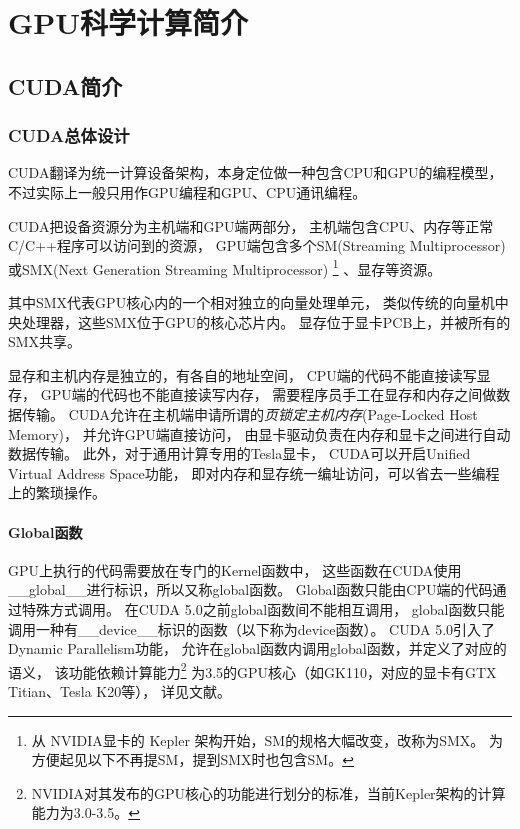 


\chapter{GPU科学计算简介}

\section{CUDA简介}

\subsection{CUDA总体设计}

CUDA翻译为统一计算设备架构，本身定位做一种包含CPU和GPU的编程模型，
不过实际上一般只用作GPU编程和GPU、CPU通讯编程。

CUDA把设备资源分为主机端和GPU端两部分，
主机端包含CPU、内存等正常C/C++程序可以访问到的资源，
GPU端包含多个SM(Streaming Multiprocessor)
或SMX(Next Generation Streaming Multiprocessor)
\footnote{从 NVIDIA显卡的 Kepler 架构开始，SM的规格大幅改变，改称为SMX。
为方便起见以下不再提SM，提到SMX时也包含SM。}
、显存等资源。

其中SMX代表GPU核心内的一个相对独立的向量处理单元，
类似传统的向量机中央处理器，这些SMX位于GPU的核心芯片内。
显存位于显卡PCB上，并被所有的SMX共享。

显存和主机内存是独立的，有各自的地址空间，
CPU端的代码不能直接读写显存，
GPU端的代码也不能直接读写内存，
需要程序员手工在显存和内存之间做数据传输。
CUDA允许在主机端申请所谓的\emph{页锁定主机内存}(Page-Locked Host Memory)，
并允许GPU端直接访问，
由显卡驱动负责在内存和显卡之间进行自动数据传输。
此外，对于通用计算专用的Tesla显卡，
CUDA可以开启Unified Virtual Address Space功能，
即对内存和显存统一编址访问，可以省去一些编程上的繁琐操作。
\cite{cudadoc-cprogrammingguide}

\subsubsection{Global函数}

GPU上执行的代码需要放在专门的Kernel函数中，
这些函数在CUDA使用\_\_global\_\_进行标识，所以又称global函数。
Global函数只能由CPU端的代码通过特殊方式调用。
在CUDA 5.0之前global函数间不能相互调用，
global函数只能调用一种有\_\_device\_\_标识的函数（以下称为device函数）。
CUDA 5.0引入了Dynamic Parallelism功能，
允许在global函数内调用global函数，并定义了对应的语义，
该功能依赖计算能力\footnote{NVIDIA对其发布的GPU核心的功能进行划分的标准，当前Kepler架构的计算能力为3.0-3.5。}%
为3.5的GPU核心（如GK110，对应的显卡有GTX Titian、Tesla K20等），
详见文献。

